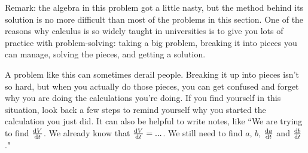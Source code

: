\begin{solution}
Remark: the algebra in this problem got a little nasty, but the method behind its solution is no more difficult than most of the problems in this section. One of the reasons why calculus is so widely taught in universities is to give you lots of practice with problem-solving: taking a big problem, breaking it into pieces you can manage, solving the pieces, and getting a solution.

A problem like this can sometimes derail people. Breaking it up into pieces isn't so hard, but when you actually do those pieces, you can get confused and forget why you are doing the calculations you're doing. If you find yourself in this situation, look back a few steps to remind yourself why you started the calculation you just did. It can also be helpful to write notes, like
``We are trying to find $\diff{V}{t}$. We already know that
                $\diff{V}{t} = ...$. We still need to find $a$, $b$,
                $\diff{a}{t}$ and $\diff{b}{t}$."

\end{solution}



